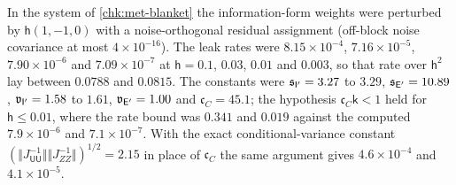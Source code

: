 \begin{numcheck}\label{chk:met-leak-bound}
In the system of \cref{chk:met-blanket} the information-form weights were perturbed by $\mathsf h(1,-1,0)$ with a noise-orthogonal residual assignment (off-block noise covariance at most $4\times10^{-16}$). The leak rates were $8.15\times10^{-4}$, $7.16\times10^{-5}$, $7.90\times10^{-6}$ and $7.09\times10^{-7}$ at $\mathsf h=0.1$, $0.03$, $0.01$ and $0.003$, so that rate over $\mathsf h^2$ lay between $0.0788$ and $0.0815$. The constants were $\mathfrak s_{\mathsf{I}'}=3.27$ to $3.29$, $\mathfrak s_{\mathsf{E}'}=10.89$, $\mathfrak v_{\mathsf{I}'}=1.58$ to $1.61$, $\mathfrak v_{\mathsf{E}'}=1.00$ and $\mathfrak c_C=45.1$; the hypothesis $\mathfrak c_C\mathsf k<1$ held for $\mathsf h\le0.01$, where the rate bound was $0.341$ and $0.019$ against the computed $7.9\times10^{-6}$ and $7.1\times10^{-7}$. With the exact conditional-variance constant $(\Vert J_{\mathsf U\mathsf U}^{-1}\Vert\Vert J_{ZZ}^{-1}\Vert)^{1/2}=2.15$ in place of $\mathfrak c_C$ the same argument gives $4.6\times10^{-4}$ and $4.1\times10^{-5}$.
\end{numcheck}

